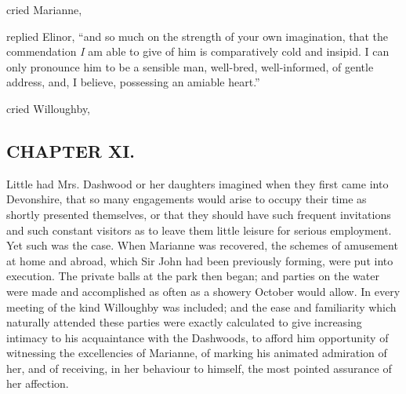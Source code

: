  cried Marianne, 

 replied Elinor, “and so much on the strength of your own imagination, that the commendation {\em I} am able to give of him is comparatively cold and insipid. I can only pronounce him to be a sensible man, well-bred, well-informed, of gentle address, and, I believe, possessing an amiable heart.”

 cried Willoughby, 

\subsection[chapter-xi.]{\useURL[url11][][][]\from[url11]CHAPTER XI.}

Little had Mrs. Dashwood or her daughters imagined when they first came into Devonshire, that so many engagements would arise to occupy their time as shortly presented themselves, or that they should have such frequent invitations and such constant visitors as to leave them little leisure for serious employment. Yet such was the case. When Marianne was recovered, the schemes of amusement at home and abroad, which Sir John had been previously forming, were put into execution. The private balls at the park then began; and parties on the water were made and accomplished as often as a showery October would allow. In every meeting of the kind Willoughby was included; and the ease and familiarity which naturally attended these parties were exactly calculated to give increasing intimacy to his acquaintance with the Dashwoods, to afford him opportunity of witnessing the excellencies of Marianne, of marking his animated admiration of her, and of receiving, in her behaviour to himself, the most pointed assurance of her affection.

